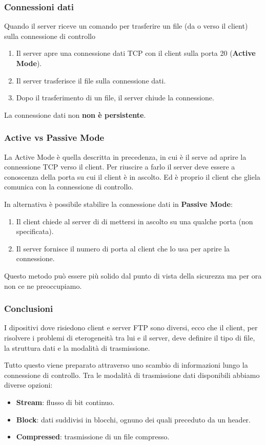 \subsubsection{Connessioni dati}
Quando il server riceve un comando per trasferire un file (da o verso 
il client) sulla connessione di controllo
\begin{enumerate}
	\item Il server apre una connessione dati TCP con il client sulla 
		porta 20 (\textbf{Active Mode}).
	\item Il server trasferisce il file sulla connessione dati.
	\item Dopo il trasferimento di un file, il server chiude la 
		connessione.
\end{enumerate}
La connessione dati non \textbf{non è persistente}.

\subsubsection{Active vs Passive Mode}
La Active Mode è quella descritta in precedenza, in cui è il serve ad 
aprire la connessione TCP verso il client. Per riuscire a farlo il 
server deve essere a conoscenza della porta su cui il client è in 
ascolto. Ed è proprio il client che gliela comunica con la connessione 
di controllo.

In alternativa è possibile stabilire la connessione dati in 
\textbf{Passive Mode}:
\begin{enumerate}
	\item Il client chiede al server di di mettersi in ascolto su una
		qualche porta (non specificata).
	\item Il server fornisce il numero di porta al client che lo usa 
		per aprire la connessione.
\end{enumerate}
Questo metodo può essere più solido dal punto di vista della sicurezza 
ma per ora non ce ne preoccupiamo.

\subsubsection{Conclusioni}
I dipositivi dove risiedono client e server FTP sono diversi, ecco che 
il client, per risolvere i problemi di eterogeneità tra lui e il
server, deve definire il tipo di file, la struttura dati e la modalità 
di trasmissione.

Tutto questo viene preparato attraverso uno scambio di informazioni 
lungo la connessione di controllo. Tra le modalità di trasmissione dati
disponibili abbiamo diverse opzioni:
\begin{itemize}
	\item \textbf{Stream}: flusso di bit continuo.
	\item \textbf{Block}: dati suddivisi in blocchi, ognuno dei quali 
		preceduto da un header.
	\item \textbf{Compressed}: trasmissione di un file compresso.
\end{itemize}

